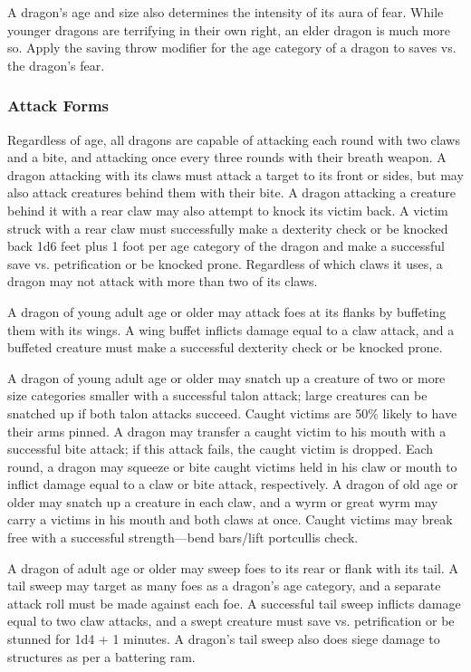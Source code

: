 \begin{multicols}{2}
A dragon's age and size also determines the intensity of its aura of fear. While younger dragons are terrifying in their own right, an elder dragon is much more so. Apply the saving throw modifier for the age category of a dragon to saves vs. the dragon's fear.

\subsubsection*{Attack Forms}

Regardless of age, all dragons are capable of attacking each round with two claws and a bite, and attacking once every three rounds with their breath weapon. A dragon attacking with its claws must attack a target to its front or sides, but may also attack creatures behind them with their bite. A dragon attacking a creature behind it with a rear claw may also attempt to knock its victim back. A victim struck with a rear claw must successfully make a dexterity check or be knocked back 1d6 feet plus 1 foot per age category of the dragon and make a successful save vs. petrification or be knocked prone. Regardless of which claws it uses, a dragon may not attack with more than two of its claws.

A dragon of young adult age or older may attack foes at its flanks by buffeting them with its wings. A wing buffet inflicts damage equal to a claw attack, and a buffeted creature must make a successful dexterity check or be knocked prone.

A dragon of young adult age or older may snatch up a creature of two or more size categories smaller with a successful talon attack; large creatures can be snatched up if both talon attacks succeed. Caught victims are 50\% likely to have their arms pinned. A dragon may transfer a caught victim to his mouth with a successful bite attack; if this attack fails, the caught victim is dropped. Each round, a dragon may squeeze or bite caught victims held in his claw or mouth to inflict damage equal to a claw or bite attack, respectively. A dragon of old age or older may snatch up a creature in each claw, and a wyrm or great wyrm may carry a victims in his mouth and both claws at once. Caught victims may break free with a successful strength---bend bars/lift portcullis check. 

A dragon of adult age or older may sweep foes to its rear or flank with its tail. A tail sweep may target as many foes as a dragon's age category, and a separate attack roll must be made against each foe. A successful tail sweep inflicts damage equal to two claw attacks, and a swept creature must save vs. petrification or be stunned for 1d4 + 1 minutes. A dragon's tail sweep also does siege damage to structures as per a battering ram.


\end{multicols}
